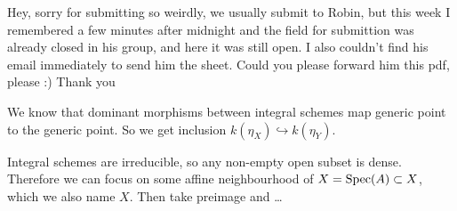 \newcommand{\sheet}{3}




\maketitle{}

Hey, sorry for submitting so weirdly, we usually submit to Robin, but this week
I remembered a few minutes after midnight and the field for submittion was already
closed in his group, and here it was still open. I also couldn't find his email
immediately to send him the sheet. Could you please forward him this pdf, please :)
Thank you

\begin{exercise}{1}
    We know that dominant morphisms between integral schemes map generic point
    to the generic point. So we get inclusion $k(\eta_X) \hookrightarrow
    k(\eta_Y)$.

    Integral schemes are irreducible, so any non-empty open subset is dense. Therefore we
    can focus on some affine neighbourhood of $X = \operatorname{Spec}(A) \subset X$, which we
    also name $X$. Then take preimage and 
    \dots
\end{exercise}

